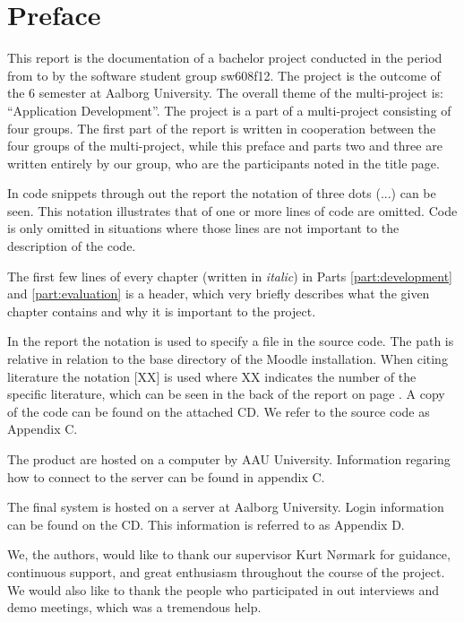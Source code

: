\chapter*{Preface}
\label{chap:preface}
This report is the documentation of a bachelor project conducted in the period from  to  by the software student group sw608f12.
The project is the outcome of the 6\ths{} semester at Aalborg University. 
The overall theme of the multi-project is: ``Application Development''. 
The project is a part of a multi-project consisting of four groups. 
The first part of the report is written in cooperation between the four groups of the multi-project, while this preface and parts two and three are written entirely by our group, who are the participants noted in the title page.

In code snippets through out the report the notation of three dots (...)  can be seen.
This notation illustrates that of one or more lines of code are omitted. 
Code is only omitted in situations where those lines are not important to the description of the code. 

The first few lines of every chapter (written in \textit{italic}) in Parts \ref{part:development} and \ref{part:evaluation} is a header, which very briefly describes what the given chapter contains and why it is important to the project.

In the report the notation  is used to specify a file in the source code. The path is relative in relation to the base directory of the Moodle installation. 
When citing literature the notation [XX] is used where XX indicates the number of the specific literature, which can be seen in the back of the report on page \pageref{chap:bib}.
A copy of the code can be found on the attached CD. 
We refer to the source code as Appendix C.

The product are hosted on a computer by AAU University. 
Information regaring how to connect to the server can be found in appendix C.

The final system is hosted on a server at Aalborg University.
Login information can be found on the CD.
This information is referred to as Appendix D.

We, the authors, would like to thank our supervisor Kurt N\o{}rmark for guidance, continuous support, and great enthusiasm throughout the course of the project.
We would also like to thank the people who participated in out interviews and demo meetings, which was a tremendous help.